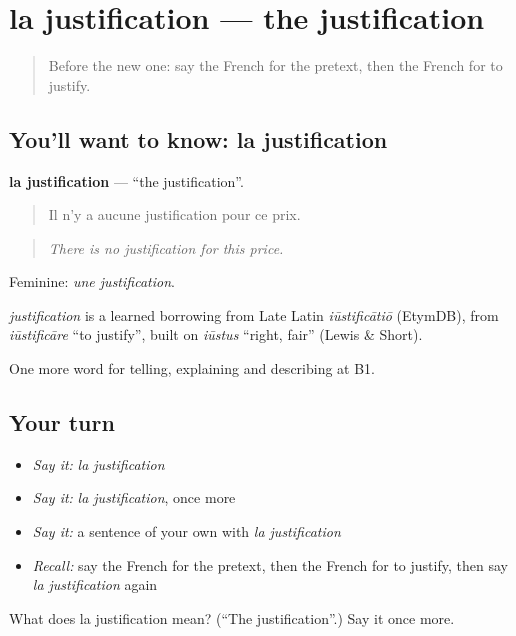 \section[la justification]{la justification — the justification}

\label{lesson:FR-C351-justification}



\begin{quote}
Before the new one: say the French for the pretext, then the French for to justify.
\end{quote}

\subsection*{You'll want to know: la justification}
\textbf{la justification} — \textquotedblleft{}the justification\textquotedblright{}.

\begin{quote}
Il n'y a aucune justification pour ce prix.
\end{quote}

\begin{quote}
\emph{There is no justification for this price.}
\end{quote}

Feminine: \emph{une justification}.

\begin{cousinweb}
\emph{justification} is a learned borrowing from Late Latin \emph{iūstificātiō} (EtymDB), from \emph{iūstificāre} \textquotedblleft{}to justify\textquotedblright{}, built on \emph{iūstus} \textquotedblleft{}right, fair\textquotedblright{} (Lewis \& Short).
\end{cousinweb}

\begin{grammarlens}[title={What you've built}]
One more word for telling, explaining and describing at B1.
\end{grammarlens}

\subsection*{Your turn}
\begin{itemize}
\raggedright
  \item \emph{Say it:} \emph{la justification}
  \item \emph{Say it:} \emph{la justification}, once more
  \item \emph{Say it:} a sentence of your own with \emph{la justification}
  \item \emph{Recall:} say the French for the pretext, then the French for to justify, then say \emph{la justification} again
\end{itemize}

\begin{tcolorbox}[breakable,colback=teal!4,colframe=teal!35!black,title={Before you move on}]
What does la justification mean? (\textquotedblleft{}The justification\textquotedblright{}.) Say it once more.
\end{tcolorbox}
